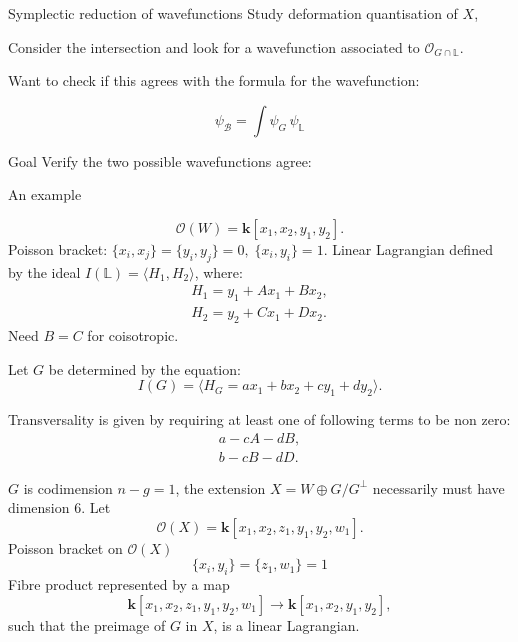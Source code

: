     \frame{\sectionpage}

    \begin{frame}{Symplectic reduction of wavefunctions}
    Study deformation quantisation of \(X\),
    
    Consider the intersection and look for a wavefunction associated to \(\mathcal{O}_{G \cap {\mathbb{L}}} \).
    
    Want to check if this agrees with the formula for the wavefunction:
    \begin{thm}
    \[ \psi_{\mathcal{B}} = \int \psi_G \, \psi_{\mathbb{L}} \]
    \end{thm}
    \end{frame}
    
    \begin{frame}{Goal}
        Verify the two possible wavefunctions agree:
    \end{frame}
    
    \begin{frame}{An example}
    \begin{ex}    
    \[ \mathcal{O}(W) =   \mathbf{k}[x_1,x_2,y_1,y_2].\] 
    Poisson bracket: 
    \(\{x_i,x_j\}=\{y_i,y_j\}=0, \; \{x_i,y_i\}=1 \). 
    Linear Lagrangian defined by the ideal \(I(\mathbb{L}) = \langle H_1, H_2\rangle\), where:
    \begin{align*}
        H_1 = y_1 + A x_1 +  B x_2,    \\
        H_2 = y_2 +  C x_1 + D x_2. 
    \end{align*}
    Need \(B=C\) for coisotropic.
    
    Let \(G\) be determined by the equation:
    \[ I(G) = \langle H_G =a x_1 + b x_2 + c y_1 + d y_2 \rangle.\]
    \end{ex}
    \end{frame} 

    \begin{frame}
    Transversality is given by requiring at least one of following terms to be non zero:
    \begin{align}
    \label{eqn:transcons2dmin}
    a - cA - dB, \\ 
    b - cB-dD.
    \end{align}
    \end{frame}
    
    \begin{frame}
    
    \(G\) is codimension \(n-g=1\), the extension \(X = W\oplus G/G^{\perp}\) necessarily must have dimension \(6\). 
    Let \[ \mathcal{O}(X) = \mathbf{k}[x_1,x_2,z_1, y_1,y_2,w_1].\] 
    Poisson bracket on \(\mathcal{O}(X)\) 
    \[ \{x_i,y_i\}=\{z_1,w_1\} = 1\]
    Fibre product represented by a map
    \begin{equation} 
    \label{eqn:extgmaprings}
    \mathbf{k}[x_1,x_2,z_1,y_1,y_2,w_1] \rightarrow \mathbf{k}[x_1,x_2,y_1,y_2],
    \end{equation}
    such that the preimage of \(G\) in \(X\), is a linear Lagrangian. 
    \end{frame}
    
